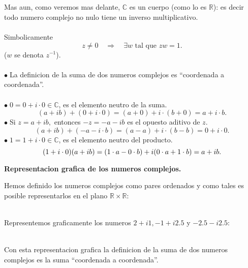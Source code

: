 \documentclass{article}
\theoremstyle{definition}
\theoremstyle{definition}
\theoremstyle{remark}
\newcommand\bl{$\bullet\;$}
\begin{document}
\\\\ Mas aun, como veremos mas delante, $\mathbb{C}$ es un cuerpo (como lo es $\mathbb{R}$): es decir todo numero complejo no nulo tiene un inverso multiplicativo.\\\\ 
Simbolicamente \[
  z \neq 0 \quad \Rightarrow \quad \exists w \text{ tal que } zw=1.
\]
($w$ se denota $z^{-1}$).
\\\\
\bl La definicion de la suma de dos numeros complejos es ``coordenada a coordenada''.\\\\
\bl $0=0+i\cdot0 \in \mathbb{C}$, es el elemento neutro de la suma. \[
  (a+ib)+(0+i\cdot 0)=(a+0)+i \cdot (b+0)=a+i\cdot b.
\]
\bl Si $z=a+ib,$ entonces $-z= -a-ib$ es el opuesto aditivo de $z$. \[
  (a+ib)+(-a-i\cdot b)=(a-a)+i\cdot(b-b)=0+i\cdot 0.
\]
\bl $1=1+i\cdot 0 \in \mathbb{C}$, es el elemento neutro del producto. \[
  (1+i\cdot 0)(a+ib) = (1\cdot a - 0 \cdot b) + i (0 \cdot a + 1 \cdot b) = a+ib. \pagebreak
\] \begin{center}
\textbf{Representacion grafica de los numeros complejos.}
\end{center}
Hemos definido los numeros complejos como pares ordenados y como tales es posible representarlos en el plano $\mathbb{R} \times \mathbb{R}$:
\begin{figure}[h]
\centering
\def\svgwidth{0.45\textwidth}

\end{figure}\\
Representemos graficamente los numeros $2+i1,-1+i 2.5$ y $-2.5-i2.5$:
\begin{figure}[h]
\centering
\def\svgwidth{0.5\textwidth}

\end{figure}\\
Con esta representacion grafica la definicion de la suma de dos numeros complejos es la suma ``coordenada a coordenada''. \\
\end{document}
